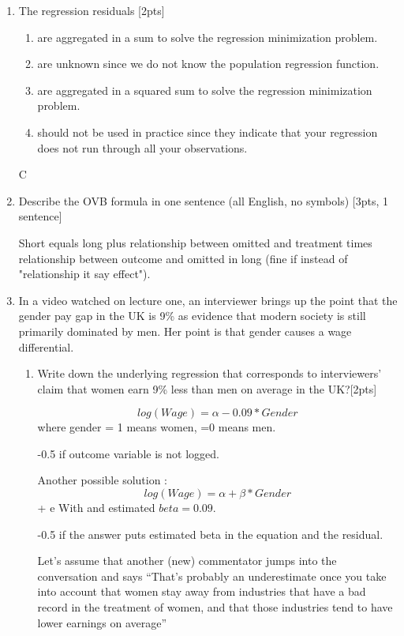 \documentclass[answers]{exam}
\begin{document}
\begin{enumerate}
\newpage
\item The regression residuals [2pts]
\begin{enumerate}[label=\alph*)]
 \item are aggregated in a sum to solve the regression minimization problem. 
 \item are unknown since we do not know the population regression function.
 \item are aggregated in a squared sum to solve the regression minimization problem. 
 \item should not be used in practice since they indicate that your regression does not run through all your observations.
  \end{enumerate}
\begin{solution}
C
\end{solution}
 
 \item Describe the OVB formula in one sentence (all English, no symbols) [3pts, 1 sentence]
\begin{solution}

Short equals long plus relationship between omitted and treatment times relationship between outcome and omitted in long (fine if instead of "relationship it say effect"). 
\end{solution}



\item In a video watched on lecture one, an interviewer brings up the point that the gender pay gap in the UK is 9\% as evidence that modern society is still primarily dominated by men. Her point is that gender causes a wage differential. \begin{enumerate}[label=\alph*)]
\item Write down the underlying regression that corresponds to interviewers' claim that women earn 9\% less than men on average in the UK?[2pts]
\begin{solution}
$$log(Wage) = \alpha -0.09 * Gender$$ 
where gender = 1 means women, =0 means men. 

-0.5 if outcome variable is not logged. 

Another possible solution : 
$$log(Wage) = \alpha + \beta * Gender$$ + e
With and estimated $beta= 0.09$. 

-0.5 if the answer puts estimated beta in the equation and the residual. 

\end{solution}

\noindent Let’s assume that another (new) commentator jumps into the conversation and says “That’s probably an underestimate once you take into account that women stay away from industries that have a bad record in the treatment of women, and that those industries tend to have lower earnings on average” 


\end{enumerate}
\end{enumerate}
\end{document}
